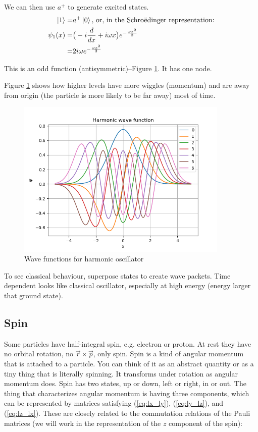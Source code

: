 \documentclass[]{article}
\begin{document}
We can then use $a^+$  to generate excited states.
\begin{align*}
	\ket{1}=& a^+ \ket{0} \text{, or, in the Schro\"edinger representation:}\\
	\psi_1(x) =& \big(-i \frac{d}{dx} + i \omega x \big) e^{-\frac{\omega x^2}{2}}\\
	=& 2 i \omega e^{-\frac{\omega x^2}{2}}
\end{align*}

This is an odd function (antisymmetric)--Figure \ref{fig:wave:harmonic}. It has one node.

Figure \ref{fig:wave:harmonic} shows how higher levels have more wiggles (momentum) and are away from origin (the particle is more likely to be far away) most of time.

\begin{figure}[H]
	\caption{Wave functions for harmonic oscillator}\label{fig:wave:harmonic}
	\includegraphics[width=0.9\textwidth]{harmonic_wavefunction}
\end{figure}

To see classical behaviour, superpose states to create wave packets. Time dependent looks like classical oscillator, especially at high energy (energy larger that ground state).



\subsection{Spin}

Some particles have half-integral spin, e.g. electron or proton. At rest they have no orbital rotation, no $\vec{r}\times\vec{p}$, only spin. Spin is a kind of angular momentum that is attached to a particle. You can think of it as an abstract quantity or as a tiny thing that is literally spinning. It transforms under rotation as angular momentum does. Spin has two states, up or down, left or right, in or out. The thing that characterizes angular momentum is having three components, which can be represented by matrices satisfying (\ref{eq:lx_ly}), (\ref{eq:ly_lz}), and (\ref{eq:lz_lx}). These are closely related to the commutation relations of the Pauli matrices (we will work in the representation of the $z$ component of the spin):
\end{document}

